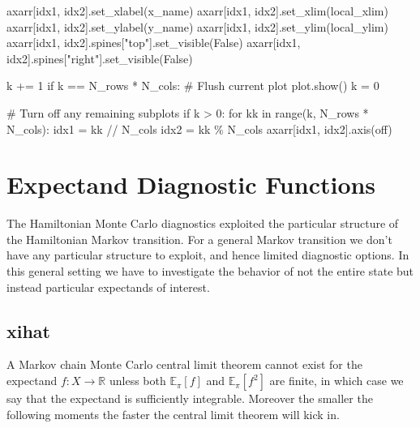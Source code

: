 \documentclass[
  letterpaper,
  DIV=11,
  numbers=noendperiod]{scrartcl}
\newenvironment{Shaded}{\begin{snugshade}}{\end{snugshade}}
\newcommand{\BuiltInTok}[1]{\textcolor[rgb]{0.00,0.23,0.31}{#1}}
\newcommand{\CommentTok}[1]{\textcolor[rgb]{0.37,0.37,0.37}{#1}}
\newcommand{\ControlFlowTok}[1]{\textcolor[rgb]{0.00,0.23,0.31}{#1}}
\newcommand{\DecValTok}[1]{\textcolor[rgb]{0.68,0.00,0.00}{#1}}
\newcommand{\KeywordTok}[1]{\textcolor[rgb]{0.00,0.23,0.31}{#1}}
\newcommand{\NormalTok}[1]{\textcolor[rgb]{0.00,0.23,0.31}{#1}}
\newcommand{\OperatorTok}[1]{\textcolor[rgb]{0.37,0.37,0.37}{#1}}
\newcommand{\StringTok}[1]{\textcolor[rgb]{0.13,0.47,0.30}{#1}}
\newcommand{\VariableTok}[1]{\textcolor[rgb]{0.07,0.07,0.07}{#1}}
\begin{document}
\begin{Shaded}
\begin{Highlighting}[]
\NormalTok{    axarr[idx1, idx2].set\_xlabel(x\_name)}
\NormalTok{    axarr[idx1, idx2].set\_xlim(local\_xlim)}
\NormalTok{    axarr[idx1, idx2].set\_ylabel(y\_name)}
\NormalTok{    axarr[idx1, idx2].set\_ylim(local\_ylim)}
\NormalTok{    axarr[idx1, idx2].spines[}\StringTok{"top"}\NormalTok{].set\_visible(}\VariableTok{False}\NormalTok{)}
\NormalTok{    axarr[idx1, idx2].spines[}\StringTok{"right"}\NormalTok{].set\_visible(}\VariableTok{False}\NormalTok{)}
    
\NormalTok{    k }\OperatorTok{+=} \DecValTok{1}
    \ControlFlowTok{if}\NormalTok{ k }\OperatorTok{==}\NormalTok{ N\_rows }\OperatorTok{*}\NormalTok{ N\_cols:}
      \CommentTok{\# Flush current plot}
\NormalTok{      plot.show()}
\NormalTok{      k }\OperatorTok{=} \DecValTok{0}
  
  \CommentTok{\# Turn off any remaining subplots}
  \ControlFlowTok{if}\NormalTok{ k }\OperatorTok{\textgreater{}} \DecValTok{0}\NormalTok{: }
    \ControlFlowTok{for}\NormalTok{ kk }\KeywordTok{in} \BuiltInTok{range}\NormalTok{(k, N\_rows }\OperatorTok{*}\NormalTok{ N\_cols):}
\NormalTok{      idx1 }\OperatorTok{=}\NormalTok{ kk }\OperatorTok{//}\NormalTok{ N\_cols}
\NormalTok{      idx2 }\OperatorTok{=}\NormalTok{ kk }\OperatorTok{\%}\NormalTok{ N\_cols}
\NormalTok{      axarr[idx1, idx2].axis(}\StringTok{\textquotesingle{}off\textquotesingle{}}\NormalTok{)}
\end{Highlighting}
\end{Shaded}

\hypertarget{expectand-diagnostic-functions}{%
\section{Expectand Diagnostic
Functions}\label{expectand-diagnostic-functions}}

The Hamiltonian Monte Carlo diagnostics exploited the particular
structure of the Hamiltonian Markov transition. For a general Markov
transition we don't have any particular structure to exploit, and hence
limited diagnostic options. In this general setting we have to
investigate the behavior of not the entire state but instead particular
expectands of interest.

\hypertarget{xihat}{%
\subsection{xihat}\label{xihat}}

A Markov chain Monte Carlo central limit theorem cannot exist for the
expectand \(f : X \rightarrow \mathbb{R}\) unless both
\(\mathbb{E}_{\pi}[f]\) and \(\mathbb{E}_{\pi}[f^{2}]\) are finite, in
which case we say that the expectand is sufficiently integrable.
Moreover the smaller the following moments the faster the central limit
theorem will kick in.
\end{document}
